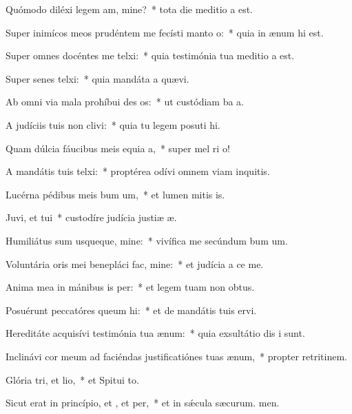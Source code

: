 \item Quómodo diléxi legem am, mine?~* tota die meditio a est.
\item Super inimícos meos prudéntem me fecísti manto o:~* quia in ænum hi est.
\item Super omnes docéntes me telxi:~* quia testimónia tua meditio a est.
\item Super senes telxi:~* quia mandáta a quævi.
\item Ab omni via mala prohíbui des os:~* ut custódiam ba a.
\item A judíciis tuis non clivi:~* quia tu legem posuti hi.
\item Quam dúlcia fáucibus meis equia a,~* super mel ri o!
\item A mandátis tuis telxi:~* proptérea odívi omnem viam inquitis.
\item Lucérna pédibus meis bum um,~* et lumen mitis is.
\item Juvi, et tui~* custodíre judícia justiæ æ.
\item Humiliátus sum usqueque, mine:~* vivífica me secúndum bum um.
\item Voluntária oris mei benepláci fac, mine:~* et judícia a ce me.
\item Anima mea in mánibus is per:~* et legem tuam non  obtus.
\item Posuérunt peccatóres queum hi:~* et de mandátis tuis  ervi.
\item Hereditáte acquisívi testimónia tua  ænum:~* quia exsultátio dis i sunt.
\item Inclinávi cor meum ad faciéndas justificatiónes tuas  ænum,~* propter retritinem.
\item Glória tri, et lio,~* et Spitui to.
\item Sicut erat in princípio, et , et per,~* et in sǽcula sæcurum. men.
